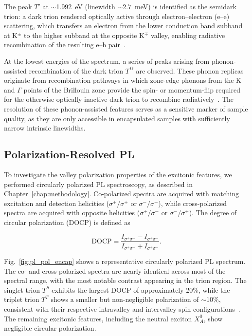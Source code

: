 The peak $T'$ at $\sim$1.992~eV (linewidth $\sim$2.7~meV) is identified as the semidark trion: a dark trion rendered optically active through electron--electron (e--e) scattering, which transfers an electron from the lower conduction band subband at K$^\pm$ to the higher subband at the opposite K$^\mp$ valley, enabling radiative recombination of the resulting e--h pair~\cite{zinkiewicz-2021c}.

At the lowest energies of the spectrum, a series of peaks arising from phonon-assisted recombination of the dark trion $T^D$ are observed. These phonon replicas originate from recombination pathways in which zone-edge phonons from the K and $\Gamma$ points of the Brillouin zone provide the spin- or momentum-flip required for the otherwise optically inactive dark trion to recombine radiatively~\cite{zinkiewicz-2021c}. The resolution of these phonon-assisted features serves as a sensitive marker of sample quality, as they are only accessible in encapsulated samples with sufficiently narrow intrinsic linewidths.

\subsection{Polarization-Resolved PL}
\label{subsec:Polarization-Resolved PL}

To investigate the valley polarization properties of the excitonic features, we performed circularly polarized PL spectroscopy, as described in Chapter~\ref{chap:methodology}. Co-polarized spectra are acquired with matching excitation and detection helicities ($\sigma^+/\sigma^+$ or $\sigma^-/\sigma^-$), while cross-polarized spectra are acquired with opposite helicities ($\sigma^+/\sigma^-$ or $\sigma^-/\sigma^+$). The degree of circular polarization (DOCP) is defined as

\begin{equation}
    \text{DOCP} = \frac{I_{\sigma^+\sigma^+} - I_{\sigma^+\sigma^-}}{I_{\sigma^+\sigma^+} + I_{\sigma^+\sigma^-}}.
\end{equation}

Fig.~\ref{fig:pl_pol_encap} shows a representative circularly polarized PL spectrum. The co- and cross-polarized spectra are nearly identical across most of the spectral range, with the most notable contrast appearing in the trion region. The singlet trion $T^S$ exhibits the largest DOCP of approximately 20\%, while the triplet trion $T^T$ shows a smaller but non-negligible polarization of $\sim$10\%, consistent with their respective intravalley and intervalley spin configurations~\cite{zinkiewicz-2021c}. The remaining excitonic features, including the neutral exciton $X_A^0$, show negligible circular polarization.

